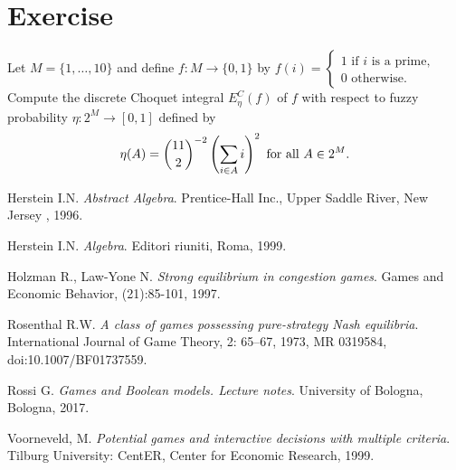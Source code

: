 \documentclass{article}
\begin{document}
\section{Exercise}
Let $M=\{1,\ldots,10\}$ and define $f:M\rightarrow\{0,1\}$ by
$f(i)=\left\{\begin{array}{c}1\text{ if }i\text{ is a prime,}\\0\text{ otherwise.}\end{array}\right .$
Compute the discrete Choquet integral $E_{\eta}^C(f)$ of $f$ with respect to fuzzy probability $\eta:2^M\rightarrow[0,1]$ defined by
$$\eta(A)=\binom{11}{2}^{-2}\left(\sum_{i\in A}i\right)^2\text{ for all }A\in 2^M\text .$$


\medskip
 


\begin{thebibliography}{9}
Herstein I.N.
\textit{Abstract Algebra}. 
Prentice-Hall Inc., Upper Saddle River, New Jersey , 1996.

Herstein I.N.
\textit{Algebra}. 
Editori riuniti, Roma, 1999.

Holzman R., Law-Yone N.
\textit{Strong equilibrium in congestion games}.
Games and Economic Behavior, (21):85-101, 1997.

Rosenthal R.W.
\textit{A class of games possessing pure-strategy Nash equilibria}.
International Journal of Game Theory, 2: 65–67, 1973, MR 0319584, doi:10.1007/BF01737559.

Rossi G.
\textit{Games and Boolean models. Lecture notes}.
University of Bologna, Bologna, 2017.

Voorneveld, M. 
\textit{Potential games and interactive decisions with multiple criteria}.
Tilburg University: CentER, Center for Economic Research, 1999.

 

\end{thebibliography}
\end{document}
